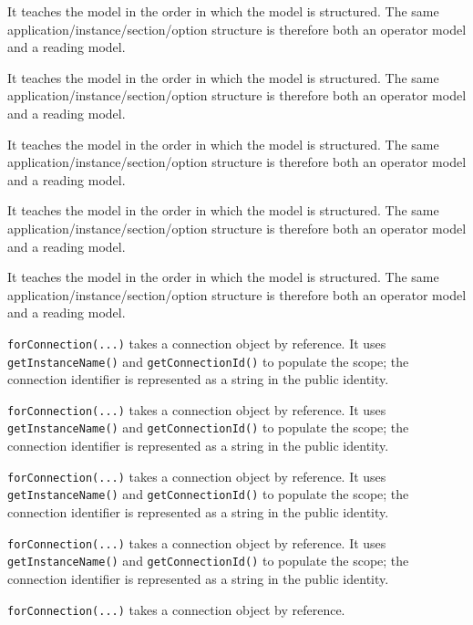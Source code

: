\documentclass[
  a4paper,
  openany]{book}
\providecommand{\passthrough}[1]{#1}
\begin{document}
\clearpage
{}
It teaches the model in the order in which the model is structured. The
same application/instance/section/option structure is therefore both an
operator model and a reading model.\par
\clearpage
{}
It teaches the model in the order in which the model is structured. The
same application/instance/section/option structure is therefore both an
operator model and a reading model.\par
\clearpage
{}
It teaches the model in the order in which the model is structured. The
same application/instance/section/option structure is therefore both an
operator model and a reading model.\par
\clearpage
{}
\begingroup\raggedright It teaches the model in the order in which the model is structured. The
same application/instance/section/option structure is therefore both an
operator model and a reading model.\par\endgroup
\clearpage
{}
It teaches the model in the order in which the model is structured. The
same application/\allowbreak{}instance/\allowbreak{}section/\allowbreak{}option structure is therefore both an
operator model and a reading model.\par
\clearpage
{}
\passthrough{\lstinline!forConnection(...)!} takes a connection object
by reference. It uses \passthrough{\lstinline!getInstanceName()!} and
\passthrough{\lstinline!getConnectionId()!} to populate the scope; the
connection identifier is represented as a string in the public identity.\par
\clearpage
{}
\passthrough{\lstinline!forConnection(...)!} takes a connection object
by reference. It uses \passthrough{\lstinline!getInstanceName()!} and
\passthrough{\lstinline!getConnectionId()!} to populate the scope; the
connection identifier is represented as a string in the public identity.\par
\clearpage
{}
\passthrough{\lstinline!forConnection(...)!} takes a connection object
by reference. It uses \passthrough{\lstinline!getInstanceName()!} and
\passthrough{\lstinline!getConnectionId()!} to populate the scope; the
connection identifier is represented as a string in the public identity.\par
\clearpage
{}
\begingroup\raggedright \passthrough{\lstinline!forConnection(...)!} takes a connection object
by reference. It uses \passthrough{\lstinline!getInstanceName()!} and
\passthrough{\lstinline!getConnectionId()!} to populate the scope; the
connection identifier is represented as a string in the public identity.\par\endgroup
\clearpage
{}
\passthrough{\lstinline!forConnection(...)!} takes a connection object
by reference.
\end{document}
